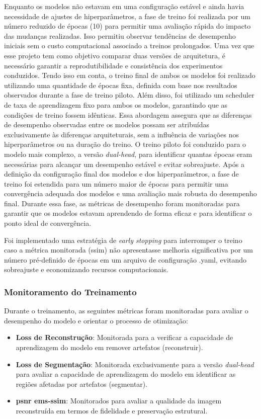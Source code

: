 Enquanto os modelos não estavam em uma configuração estável e ainda havia necessidade de ajustes de hiperparâmetros, a fase de treino foi realizada por um número reduzido de épocas (10) para permitir uma avaliação rápida do impacto das mudanças realizadas. Isso permitiu  observar tendências de desempenho iniciais sem o custo computacional associado a treinos prolongados.
Uma vez que esse projeto tem como objetivo comparar duas versões de arquitetura, é necessário garantir a reprodutibilidade e consistência dos experimentos conduzidos. Tendo isso em conta, o treino final de ambos os modelos foi realizado utilizando uma quantidade de épocas fixa, definida com base nos resultados observados durante a fase de treino piloto. Além disso, foi utilizado um scheduler de taxa de aprendizagem fixo para ambos os modelos, garantindo que as condições de treino fossem idênticas. Essa abordagem assegura que as diferenças de desempenho observadas entre os modelos possam ser atribuídas exclusivamente às diferenças arquiteturais, sem a influência de variações nos hiperparâmetros ou na duração do treino.
O treino piloto foi conduzido para o modelo mais complexo, a versão \textit{dual-head}, para identificar quantas épocas eram necessárias para alcançar um desempenho estável e evitar sobreajuste.
Após a definição da configuração final dos modelos e dos hiperparâmetros, a fase de treino foi estendida para um número maior de épocas para permitir uma convergência adequada dos modelos e uma avaliação mais robusta do desempenho final. Durante essa fase, as métricas de desempenho foram monitoradas para garantir que os modelos estavam aprendendo de forma eficaz e para identificar o ponto ideal de convergência.

Foi implementado uma estratégia de \textit{early stopping} para interromper o treino caso a métrica monitorada (\acrshort{ssim}) não apresentasse melhoria significativa por um número pré-definido de épocas em um arquivo de configuração .yaml, evitando sobreajuste e economizando recursos computacionais.

\subsubsection{Monitoramento do Treinamento}
Durante o treinamento, as seguintes métricas foram monitoradas para avaliar o desempenho do modelo e orientar o processo de otimização:
\begin{itemize}
    \item \textbf{Loss de Reconstrução}: Monitorada para a verificar a capacidade de aprendizagem do modelo em remover artefatos (reconstruir).
    \item \textbf{Loss de Segmentação}: Monitorada exclusivamente para a versão \textit{dual-head} para avaliar a capacidade de aprendizagem do modelo em identificar as regiões afetadas por artefatos (segmentar).
    \item \textbf{\acrshort{psnr} e\acrshort{ms-ssim}}: Monitorados para avaliar a qualidade da imagem reconstruída em termos de fidelidade e preservação estrutural.   
\end{itemize}

